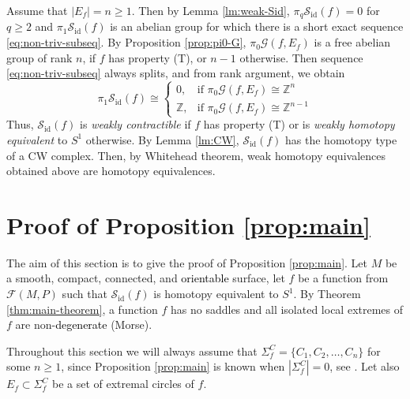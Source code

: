 \documentclass[10pt,reqno]{amsart}
\newcommand{\bbZ}{\mathbb{Z}}
\newcommand{\Sid}{\mathcal{S}_{\id}(f)}
\newcommand{\F}{\mathcal{F}(M,P)}
\newcommand{\id}{\mathrm{id}}
\newcommand{\Crit}{\Sigma_f}
\newcommand{\CritC}{\Crit^C}
\newcommand{\textr}[1]{\textcolor{black}{#1}}
\begin{document}
Assume that $|E_f| = n\geq 1$. Then by Lemma \ref{lm:weak-Sid}, $\pi_q\mathcal{S}_{\id}(f) = 0$ for $q\geq 2$ and $\pi_1\mathcal{S}_{\id}(f)$ is an abelian group for which there is a short exact sequence \eqref{eq:non-triv-subseq}. By Proposition \ref{prop:pi0-G}, $\pi_0\mathcal{G}(f,E_f)$ is a free abelian group of rank $n$, if $f$ has property (T), or $n-1$ otherwise. 
Then sequence  \eqref{eq:non-triv-subseq} always splits, and  from rank argument, we obtain
$$
\pi_1\mathcal{S}_{\id}(f)\cong \begin{cases}
	0, & \text{if }\pi_0\mathcal{G}(f, E_f)\cong \bbZ^n\\
	\bbZ, & \text{if }\pi_0\mathcal{G}(f, E_f)\cong \bbZ^{n-1}
\end{cases}
$$
Thus, $\mathcal{S}_{\id}(f)$ is {\it weakly contractible} if $f$ has property (T)  or is {\it weakly homotopy equivalent} to $S^1$ otherwise. 
By Lemma \ref{lm:CW}, $\Sid$ has the homotopy type of a CW complex. Then, by Whitehead theorem, weak homotopy equivalences obtained above are  {homotopy equivalences}.








\section{Proof of Proposition \ref{prop:main}}\label{sec:proof-main-prop}
The aim of this section is to give the proof of Proposition \ref{prop:main}.  
Let $M$ be a smooth, compact, connected, and \textr{orientable} surface, let $f$ be a function from $\F$ such that $\Sid$ is homotopy equivalent to $S^1$. By Theorem \ref{thm:main-theorem}, a function $f$ has no saddles and all isolated local extremes of $f$ are non-\textr{degenerate} (Morse). 

Throughout this section we will always assume that $\CritC = \{C_1,C_2,\ldots, C_n\}$ for some $n\geq 1$, since Proposition \ref{prop:main} is known when $|\CritC| =0$, see \cite[Remark 2.5.2.]{Maksymenko:TopAppl:2018}. Let also $E_f\subset \CritC$ be a set of extremal circles of $f$.
\end{document}

